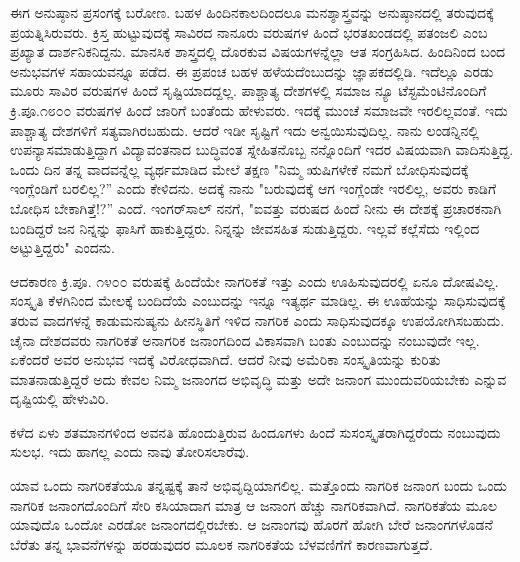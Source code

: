 ಈಗ ಅನುಷ್ಠಾನ ಪ್ರಸಂಗಕ್ಕೆ ಬರೋಣ. ಬಹಳ ಹಿಂದಿನಕಾಲದಿಂದಲೂ ಮನಶ್ಶಾಸ್ತ್ರವನ್ನು ಅನುಷ್ಠಾನದಲ್ಲಿ ತರುವುದಕ್ಕೆ ಪ್ರಯತ್ನಿಸಿರುವರು. ಕ್ರಿಸ್ತ ಹುಟ್ಟುವುದಕ್ಕೆ ಸಾವಿರದ ನಾನೂರು ವರುಷಗಳ ಹಿಂದೆ ಭರತಖಂಡದಲ್ಲಿ ಪತಂಜಲಿ ಎಂಬ ಪ್ರಖ್ಯಾತ ದಾರ್ಶನಿಕನಿದ್ದನು. ಮಾನಸಿಕ ಶಾಸ್ತ್ರದಲ್ಲಿ ದೊರಕುವ ವಿಷಯಗಳನ್ನೆಲ್ಲಾ ಆತ ಸಂಗ್ರಹಿಸಿದ. ಹಿಂದಿನಿಂದ ಬಂದ ಅನುಭವಗಳ ಸಹಾಯವನ್ನೂ ಪಡೆದ. ಈ ಪ್ರಪಂಚ ಬಹಳ ಹಳೆಯದೆಂಬುದನ್ನು ಜ್ಞಾಪಕದಲ್ಲಿಡಿ. ಇದೆಲ್ಲೂ ಎರಡು ಮೂರು ಸಾವಿರ ವರುಷಗಳ ಹಿಂದೆ ಸೃಷ್ಟಿಯಾದದ್ದಲ್ಲ. ಪಾಶ್ಚಾತ್ಯ ದೇಶಗಳಲ್ಲಿ ಸಮಾಜ ನ್ಯೂ ಟೆಸ್ಟಮೆಂಟಿನೊಂದಿಗೆ ಕ್ರಿ.ಪೂ.೧೮೦೦ ವರುಷಗಳ ಹಿಂದೆ ಜಾರಿಗೆ ಬಂತೆಂದು ಹೇಳುವರು. ಇದಕ್ಕೆ ಮುಂಚೆ ಸಮಾಜವೇ ಇರಲಿಲ್ಲವಂತೆ. ಇದು ಪಾಶ್ಚಾತ್ಯ ದೇಶಗಳಿಗೆ ಸತ್ಯವಾಗಿರಬಹುದು. ಆದರೆ ಇಡೀ ಸೃಷ್ಟಿಗೆ ಇದು ಅನ್ವಯಿಸುವುದಿಲ್ಲ. ನಾನು ಲಂಡನ್ನಿನಲ್ಲಿ ಉಪನ್ಯಾಸ\break ಮಾಡುತ್ತಿದ್ದಾಗ ವಿದ್ಯಾವಂತನಾದ ಬುದ್ಧಿವಂತ ಸ್ನೇಹಿತನೊಬ್ಬ ನನ್ನೊಂದಿಗೆ ಇದರ ವಿಷಯವಾಗಿ ವಾದಿಸುತ್ತಿದ್ದ. ಒಂದು ದಿನ ತನ್ನ ವಾದವನ್ನೆಲ್ಲ ವ್ಯರ್ಥಮಾಡಿದ ಮೇಲೆ ತಕ್ಷಣ "ನಿಮ್ಮ ಋಷಿಗಳೇಕೆ ನಮಗೆ ಬೋಧಿಸುವುದಕ್ಕೆ ಇಂಗ್ಲೆಂಡಿಗೆ ಬರಲಿಲ್ಲ?” ಎಂದು ಕೇಳಿದನು. ಅದಕ್ಕೆ ನಾನು "ಬರುವುದಕ್ಕೆ ಆಗ ಇಂಗ್ಲೆಂಡೇ ಇರಲಿಲ್ಲ, ಅವರು ಕಾಡಿಗೆ ಬೋಧಿಸ ಬೇಕಾಗಿತ್ತೆ!?” ಎಂದೆ. ಇಂಗರ್‌ಸಾಲ್ ನನಗೆ, "ಐವತ್ತು ವರುಷದ ಹಿಂದೆ ನೀನು ಈ ದೇಶಕ್ಕೆ ಪ್ರಚಾರಕನಾಗಿ ಬಂದಿದ್ದರೆ ಜನ ನಿನ್ನನ್ನು ಫಾಸಿಗೆ ಹಾಕುತ್ತಿದ್ದರು. ನಿನ್ನನ್ನು ಜೀವಸಹಿತ ಸುಡುತ್ತಿದ್ದರು. ಇಲ್ಲವೆ ಕಲ್ಲೆಸೆದು ಇಲ್ಲಿಂದ ಅಟ್ಟುತ್ತಿದ್ದರು" ಎಂದನು.

ಆದಕಾರಣ ಕ್ರಿ.ಪೂ. ೧೪೦೦ ವರುಷಕ್ಕೆ ಹಿಂದೆಯೇ ನಾಗರಿಕತೆ ಇತ್ತು ಎಂದು ಊಹಿಸುವುದರಲ್ಲಿ ಏನೂ ದೋಷವಿಲ್ಲ. ಸಂಸ್ಕೃತಿ ಕೆಳಗಿನಿಂದ ಮೇಲಕ್ಕೆ ಬಂದಿದೆಯೆ ಎಂಬುದನ್ನು ಇನ್ನೂ ಇತ್ಯರ್ಥ ಮಾಡಿಲ್ಲ. ಈ ಊಹೆಯನ್ನು ಸಾಧಿಸುವುದಕ್ಕೆ ತರುವ ವಾದಗಳನ್ನೆ ಕಾಡುಮನುಷ್ಯನು ಹೀನಸ್ಥಿತಿಗೆ ಇಳಿದ ನಾಗರಿಕ ಎಂದು ಸಾಧಿಸುವುದಕ್ಕೂ ಉಪಯೋಗಿಸಬಹುದು. ಚೈನಾ ದೇಶದವರು ನಾಗರಿಕತೆ ಅನಾಗರಿಕ ಜನಾಂಗದಿಂದ ವಿಕಾಸವಾಗಿ ಬಂತು ಎಂಬುದನ್ನು ನಂಬುವುದೇ ಇಲ್ಲ. ಏಕೆಂದರೆ ಅವರ ಅನುಭವ ಇದಕ್ಕೆ ವಿರೋಧವಾಗಿದೆ. ಆದರೆ ನೀವು ಅಮೆರಿಕಾ ಸಂಸ್ಕೃತಿಯನ್ನು ಕುರಿತು ಮಾತನಾಡುತ್ತಿದ್ದರೆ ಅದು ಕೇವಲ ನಿಮ್ಮ ಜನಾಂಗದ ಅಭಿವೃದ್ಧಿ ಮತ್ತು ಅದೇ ಜನಾಂಗ ಮುಂದುವರಿಯಬೇಕು ಎನ್ನುವ ದೃಷ್ಟಿಯಲ್ಲಿ ಹೇಳುವಿರಿ.

ಕಳೆದ ಏಳು ಶತಮಾನಗಳಿಂದ ಅವನತಿ ಹೊಂದುತ್ತಿರುವ ಹಿಂದೂಗಳು ಹಿಂದೆ ಸುಸಂಸ್ಕೃತರಾಗಿದ್ದರೆಂದು ನಂಬುವುದು ಸುಲಭ. ಇದು ಹಾಗಲ್ಲ ಎಂದು ನಾವು ತೋರಿಸಲಾರೆವು.

ಯಾವ ಒಂದು ನಾಗರಿಕತೆಯೂ ತನ್ನಷ್ಟಕ್ಕೆ ತಾನೆ ಅಭಿವೃದ್ದಿಯಾಗಲಿಲ್ಲ. ಮತ್ತೊಂದು ನಾಗರಿಕ ಜನಾಂಗ ಬಂದು ಒಂದು ನಾಗರಿಕ ಜನಾಂಗದೊಂದಿಗೆ ಸೇರಿ ಕಸಿಯಾದಾಗ ಮಾತ್ರ ಆ ಜನಾಂಗ ಹೆಚ್ಚು ನಾಗರಿಕವಾಗಿದೆ. ನಾಗರಿಕತೆಯ ಮೂಲ ಯಾವುದೊ ಒಂದೋ ಎರಡೋ ಜನಾಂಗದಲ್ಲಿರಬೇಕು. ಆ ಜನಾಂಗವು ಹೊರಗೆ ಹೋಗಿ ಬೇರೆ ಜನಾಂಗಗಳೊಡನೆ ಬೆರೆತು ತನ್ನ ಭಾವನೆಗಳನ್ನು ಹರಡುವುದರ ಮೂಲಕ ನಾಗರಿಕತೆಯ ಬೆಳವಣಿಗೆಗೆ ಕಾರಣವಾಗುತ್ತದೆ.

